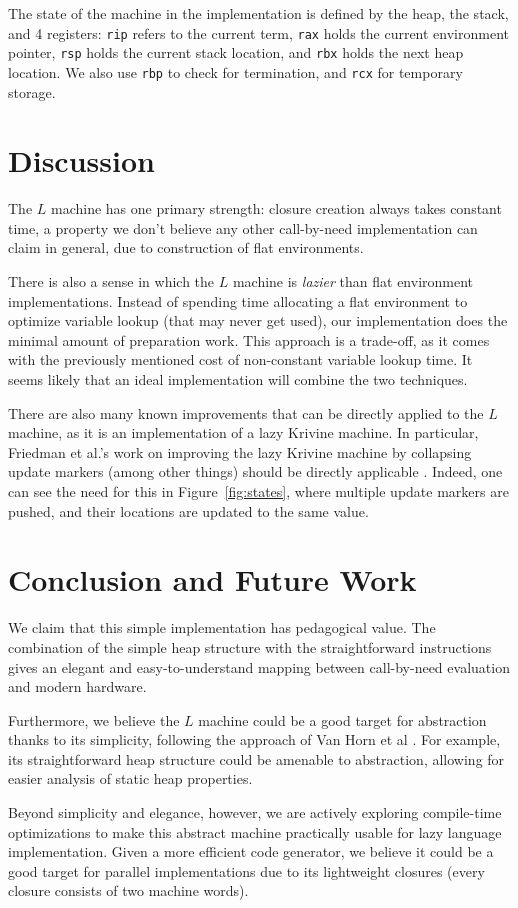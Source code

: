\documentclass[preprint]{sigplanconf}
\begin{document}
The state of the machine in the implementation is defined by the heap, the
stack, and 4 registers: \texttt{rip} refers to the current term, \texttt{rax}
holds the current environment pointer, \texttt{rsp} holds the current stack
location, and \texttt{rbx} holds the next heap location. We also use
\texttt{rbp} to check for termination, and \texttt{rcx} for temporary storage.



\section{Discussion}
The $L$ machine has one primary strength: closure creation always takes 
constant time, a property we don't believe any other call-by-need implementation
can claim in general, due to construction of flat environments.

There is also a sense in which the $L$ machine is \emph{lazier} than flat
environment implementations. Instead of spending time allocating a flat
environment to optimize variable lookup (that may never get used), our
implementation does the minimal amount of preparation work. This approach is a
trade-off, as it comes with the previously mentioned cost of non-constant
variable lookup time. It seems likely that an ideal implementation will combine
the two techniques. 

There are also many known improvements that can be directly applied to the $L$
machine, as it is an implementation of a lazy Krivine machine. In particular,
Friedman et al.'s work on improving the lazy Krivine machine by collapsing
update markers (among other things) should be directly applicable \cite{lkm}.
Indeed, one can see the need for this in Figure~\ref{fig:states}, where multiple
update markers are pushed, and their locations are updated to the same value.

\section{Conclusion and Future Work}
We claim that this simple implementation has pedagogical value. The combination
of the simple heap structure with the straightforward instructions gives an
elegant and easy-to-understand mapping between call-by-need evaluation and
modern hardware.

Furthermore, we believe the $L$ machine could be a good target for abstraction
thanks to its simplicity, following the approach of Van Horn et
al \cite{van2010abstracting}. For example, its straightforward heap structure
could be amenable to abstraction, allowing for easier analysis of static heap
properties.

Beyond simplicity and elegance, however, we are actively exploring compile-time
optimizations to make this abstract machine practically usable for lazy language
implementation. Given a more efficient code generator, we believe it could be a
good target for parallel implementations due to its lightweight closures (every
closure consists of two machine words).



\end{document}
